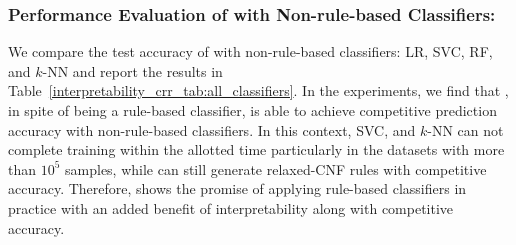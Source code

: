  
 
 
 

\subsubsection*{Performance Evaluation of {\crr} with Non-rule-based Classifiers:}

We compare  the  test accuracy of {\crr} with  non-rule-based classifiers:  LR, SVC, RF, and $ k $-NN and report the results in Table~\ref{interpretability_crr_tab:all_classifiers}. In the experiments, we  find that {\crr},  in spite of being a rule-based classifier, is able to achieve competitive prediction accuracy with non-rule-based classifiers.  In this context, SVC, and $ k $-NN  can not complete training  within the allotted time particularly in the  datasets with more than $ 10^5 $ samples, while {\crr} can still generate relaxed-CNF rules with competitive accuracy. 
Therefore, {\crr} shows the promise of applying rule-based classifiers in practice with an added benefit of interpretability along with competitive accuracy.






